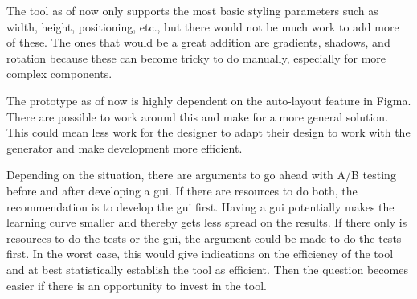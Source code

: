 The tool as of now only supports the most basic styling parameters such as width, height, positioning, etc., but there would not be much work to add more of these. The ones that would be a great addition are gradients, shadows, and rotation because these can become tricky to do manually, especially for more complex components. 

The prototype as of now is highly dependent on the auto-layout feature in Figma. There are possible to work around this and make for a more general solution. This could mean less work for the designer to adapt their design to work with the generator and make development more efficient. 

Depending on the situation, there are arguments to go ahead with A/B testing before and after developing a \acrshort{gui}. If there are resources to do both, the recommendation is to develop the \acrshort{gui} first. Having a \acrshort{gui} potentially makes the learning curve smaller and thereby gets less spread on the results. If there only is resources to do the tests or the \acrshort{gui}, the argument could be made to do the tests first. In the worst case, this would give indications on the efficiency of the tool and at best statistically establish the tool as efficient. Then the question becomes easier if there is an opportunity to invest in the tool. 
